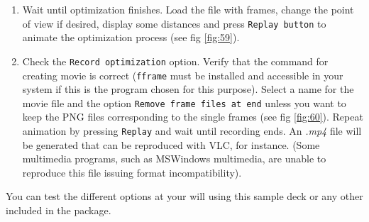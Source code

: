 \documentclass[a4paper,10pt]{article}
\begin{document}
\begin{enumerate}
\item Wait until optimization finishes. Load the file with frames, 
change the point of view if desired, display some distances and press
\texttt{Replay button} to animate the optimization process (see fig \ref{fig:59}).

\item Check the \texttt{Record optimization} option. Verify that the command for creating 
movie is correct (\texttt{fframe} must be installed and accessible in your system
if this is the program chosen for this purpose). Select a name for the movie file and
the option \texttt{Remove frame files at end} unless you want to keep the PNG
files corresponding to the single frames (see fig \ref{fig:60}). 
Repeat animation by pressing \texttt{Replay} and wait until recording ends. 
An {\it *.mp4} file will be generated that can be reproduced
with VLC, for instance. (Some multimedia programs, such as MSWindows multimedia,
are unable to reproduce this file issuing format incompatibility).




\end{enumerate}

You can test the different options at your will using this sample deck or any
other included in the package.

\newpage
\end{document}
